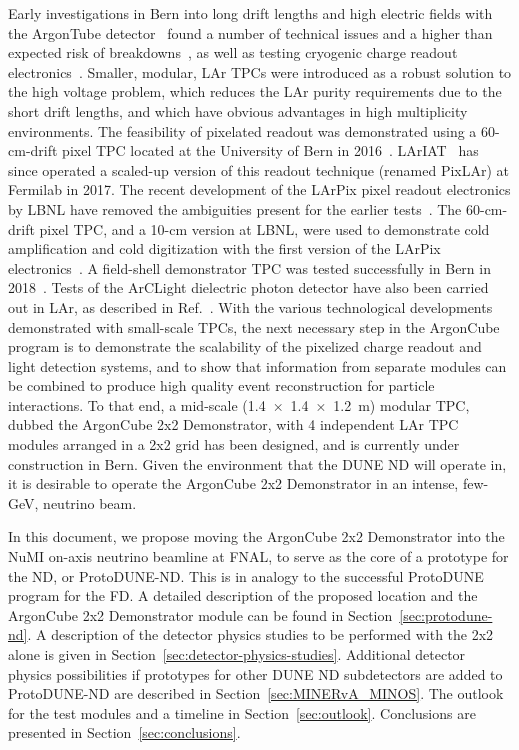 Early investigations in Bern into long drift lengths and high electric fields with the ArgonTube detector~\cite{argontube_design} found a number of technical issues and a higher than expected risk of breakdowns~\cite{argontube}, as well as testing cryogenic charge readout electronics~\cite{art_cold_ero}. Smaller, modular, LAr TPCs were introduced as a robust solution to the high voltage problem, which reduces the LAr purity requirements due to the short drift lengths, and which have obvious advantages in high multiplicity environments. The feasibility of pixelated readout was demonstrated using a 60-cm-drift pixel TPC located at the University of Bern in 2016~\cite{pixels}. LArIAT~\cite{lariat} has since operated a scaled-up version of this readout technique (renamed PixLAr) at Fermilab in 2017. The recent development of the LArPix pixel readout electronics by LBNL have removed the ambiguities present for the earlier tests~\cite{larpix}. The 60-cm-drift pixel TPC, and a 10-cm version at LBNL, were used to demonstrate cold amplification and cold digitization with the first version of the LArPix electronics~\cite{larpix}. A field-shell demonstrator TPC was tested successfully in Bern in 2018~\cite{argoncube_fd}. Tests of the ArCLight dielectric photon detector have also been carried out in LAr, as described in Ref.~\cite{arclight}. With the various technological developments demonstrated with small-scale TPCs, the next necessary step in the ArgonCube program is to demonstrate the scalability of the pixelized charge readout and light detection systems, and to show that information from separate modules can be combined to produce high quality event reconstruction for particle interactions. To that end, a mid-scale (\SI[product-units=repeat]{1.4x1.4x1.2}{\metre}) modular TPC, dubbed the ArgonCube 2x2 Demonstrator, with 4 independent LAr TPC modules arranged in a 2x2 grid has been designed, and is currently under construction in Bern. Given the environment that the DUNE ND will operate in, it is desirable to operate the ArgonCube 2x2 Demonstrator in an intense, few-GeV, neutrino beam.


In this document, we propose moving the ArgonCube 2x2 Demonstrator into the NuMI on-axis neutrino beamline at FNAL, to serve as the core of a prototype for the ND, or ProtoDUNE-ND. This is in analogy to the successful ProtoDUNE program for the FD. A detailed description of the proposed location and the ArgonCube 2x2 Demonstrator module can be found in Section~\ref{sec:protodune-nd}. A description of the detector physics studies to be performed with the 2x2 alone is given in Section~\ref{sec:detector-physics-studies}. Additional detector physics possibilities if prototypes for other DUNE ND subdetectors are added to ProtoDUNE-ND are described in Section~\ref{sec:MINERvA_MINOS}. The outlook for the test modules and a timeline in Section~\ref{sec:outlook}. Conclusions are presented in Section~\ref{sec:conclusions}.

